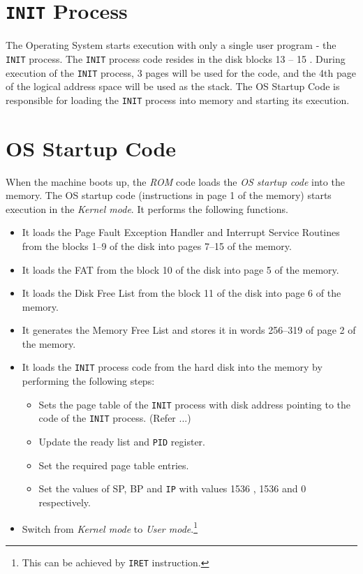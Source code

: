 \documentclass[10pt]{report}
\begin{document}
\section{\texttt{INIT} Process}
\label{lbl:INITprocess}
The Operating System starts execution with only a single user program - the \texttt{INIT} process. The \texttt{INIT} process code resides in the disk blocks 13 -- 15 . During execution of the \texttt{INIT} process, 3 pages will be used for the code, and the 4th page of the logical address space will be used as the stack. The OS Startup Code is responsible for loading the \texttt{INIT} process into memory and starting its execution.


\section{OS Startup Code}
\label{lbl:oscode}
When the machine boots up, the \textit{ROM} code loads the \textit{OS startup code} into the  memory. The OS startup code (instructions in page 1 of the memory) starts execution in the \textit{Kernel mode}. It performs the following functions.
\begin{itemize}
	\item It loads the Page Fault Exception Handler and Interrupt Service Routines from the blocks 1--9 of the disk into pages 7--15 of the memory.
	\item It loads the FAT from the block 10 of the disk into page 5 of the memory.
	\item It loads the Disk Free List from the block 11 of the disk into page 6 of the memory.
	\item It generates the Memory Free List and stores it in words 256--319 of page 2 of the memory.
	\item It loads the \texttt{INIT} process code from the hard disk into the memory by performing the following steps:
	\begin{itemize}
		\item Sets the page table of the \texttt{INIT} process with disk address pointing to the code of the \texttt{INIT} process. (Refer ...)		
		\item Update the ready list and \texttt{PID} register.
		\item Set the required page table entries.
		\item Set the values of SP, BP and \texttt{IP} with values 1536 , 1536 and 0 respectively.
	\end{itemize}
	\item Switch from \textit{Kernel mode} to \textit{User mode}.\footnote{This can be achieved by  \texttt{IRET} instruction.}
\end{itemize}
\end{document}
